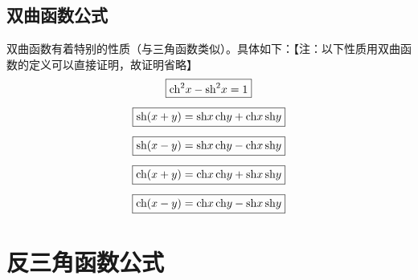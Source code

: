 \subsection{双曲函数公式}
双曲函数有着特别的性质（与三角函数类似）。具体如下：【注：以下性质用双曲函数的定义可以直接证明，故证明省略】
\begin{align}
	\boxed{\text{ch}^2 x - \text{sh}^2 x = 1} \qquad \quad\\[0.5em]
	\boxed{\text{sh} (x + y) = \text{sh} x \,\text{ch} y + \text{ch} x \,\text{sh} y} \\[0.5em]
	\boxed{\text{sh} (x - y) = \text{sh} x \,\text{ch} y - \text{ch} x \,\text{sh} y} \\[0.5em]
	\boxed{\text{ch} (x + y) = \text{ch} x \,\text{ch} y + \text{sh} x \,\text{sh} y} \\[0.5em]
	\boxed{\text{ch} (x - y) = \text{ch} x \,\text{ch} y - \text{sh} x \,\text{sh} y}  
\end{align}

\section{反三角函数公式}
